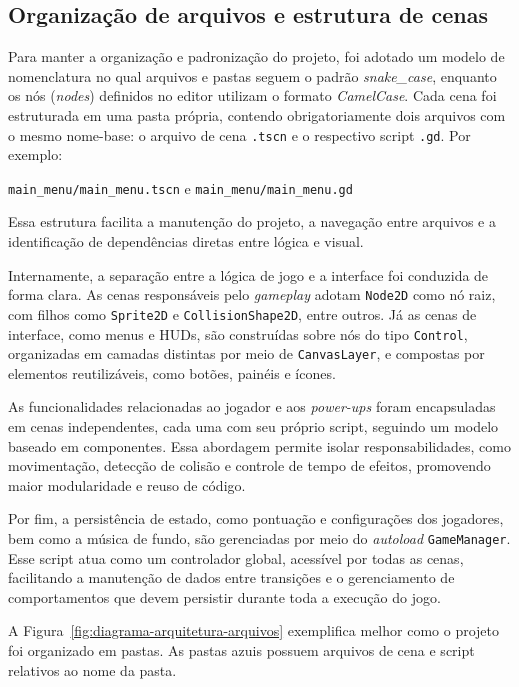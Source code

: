 \subsection{Organização de arquivos e estrutura de cenas}

Para manter a organização e padronização do projeto, foi adotado um modelo de nomenclatura no qual arquivos e pastas seguem o padrão \textit{snake\_case}, enquanto os nós (\textit{nodes}) definidos no editor utilizam o formato \textit{CamelCase}. Cada cena foi estruturada em uma pasta própria, contendo obrigatoriamente dois arquivos com o mesmo nome-base: o arquivo de cena \texttt{.tscn} e o respectivo script \texttt{.gd}. Por exemplo:

\begin{center}
\texttt{main\_menu/main\_menu.tscn} e \texttt{main\_menu/main\_menu.gd}
\end{center}

Essa estrutura facilita a manutenção do projeto, a navegação entre arquivos e a identificação de dependências diretas entre lógica e visual.

Internamente, a separação entre a lógica de jogo e a interface foi conduzida de forma clara. As cenas responsáveis pelo \textit{gameplay} adotam \texttt{Node2D} como nó raiz, com filhos como \texttt{Sprite2D} e \texttt{CollisionShape2D}, entre outros. Já as cenas de interface, como menus e HUDs, são construídas sobre nós do tipo \texttt{Control}, organizadas em camadas distintas por meio de \texttt{CanvasLayer}, e compostas por elementos reutilizáveis, como botões, painéis e ícones.

As funcionalidades relacionadas ao jogador e aos \textit{power-ups} foram encapsuladas em cenas independentes, cada uma com seu próprio script, seguindo um modelo baseado em componentes. Essa abordagem permite isolar responsabilidades, como movimentação, detecção de colisão e controle de tempo de efeitos, promovendo maior modularidade e reuso de código.

Por fim, a persistência de estado, como pontuação e configurações dos jogadores, bem como a música de fundo, são gerenciadas por meio do \textit{autoload} \texttt{GameManager}. Esse script atua como um controlador global, acessível por todas as cenas, facilitando a manutenção de dados entre transições e o gerenciamento de comportamentos que devem persistir durante toda a execução do jogo.

A Figura~\ref{fig:diagrama-arquitetura-arquivos} exemplifica melhor como o projeto foi organizado em pastas. As pastas azuis possuem arquivos de cena e script relativos ao nome da pasta.

